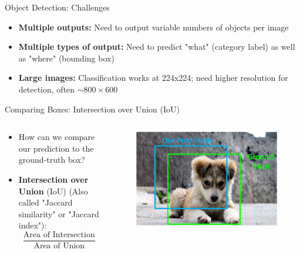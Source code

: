 \documentclass[10pt]{beamer}
\theoremstyle{remark}
\theoremstyle{definition}
\begin{document}
\begin{frame}{Object Detection: Challenges}
\begin{itemize}
    \item \textbf{Multiple outputs:} Need to output variable numbers of objects per image
    \item \textbf{Multiple types of output:} Need to predict "what" (category label) as well as "where" (bounding box)
    \item \textbf{Large images:} Classification works at 224x224; need higher resolution for detection, often $\sim 800 \times 600$

\end{itemize}
    
\end{frame}

\begin{frame}{Comparing Boxes: Intersection over Union (IoU)}
\begin{columns}
\begin{column}{0.5\textwidth}
    \begin{itemize}
        \item How can we compare our prediction to the ground-truth box?
        
        \item<2-> \textbf{Intersection over Union} (IoU) (Also called "Jaccard similarity" or "Jaccard index"):
        $$\frac{\text{Area of Intersection}}{\text{Area of Union}}$$
    \end{itemize}
\end{column}

\begin{column}{0.5\textwidth}
    \begin{figure}
    \centering
    \includegraphics[width=1.0\textwidth,height=1.0\textheight,keepaspectratio]{./images/object_2.png}
    \end{figure}
\end{column}

\end{columns}
    
\end{frame}
\end{document}

